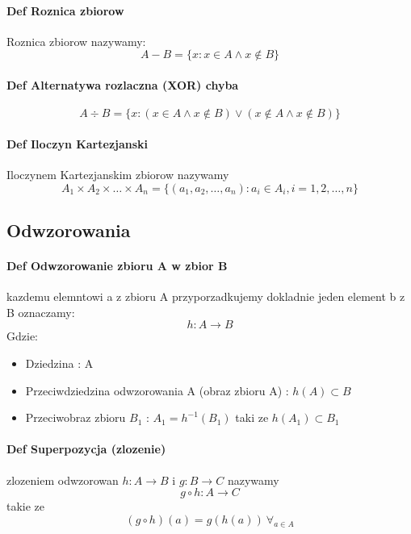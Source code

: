 \documentclass[a4paper]{article}
\begin{document}
    \paragraph{Def Roznica zbiorow}
    Roznica zbiorow nazywamy:
    \begin{equation}
        A - B  = \{x:x \in A \wedge x \notin B\}
    \end{equation}
    \paragraph{Def Alternatywa rozlaczna (XOR) chyba}
    \begin{equation}
        A \div B = \{ x : (x \in A \wedge x \notin B ) \vee (x \notin A \wedge x \notin B) \}
    \end{equation}
    \paragraph{Def Iloczyn Kartezjanski}
    Iloczynem Kartezjanskim zbiorow nazywamy
    \begin{equation}
        A_1 \times A_2 \times \ldots \times A_n = \{ (a_1,a_2, \ldots ,a_n ) : a_i \in A_i, i = 1,2,\ldots,n \}
    \end{equation}
\subsection{Odwzorowania}
\paragraph{Def Odwzorowanie zbioru A w zbior B}
kazdemu elemntowi a z zbioru A przyporzadkujemy dokladnie jeden element b z B oznaczamy:
\begin{equation}
h : A \rightarrow B
\end{equation}
Gdzie:
\begin{itemize}
    \item Dziedzina : A
    \item Przeciwdziedzina odwzorowania A (obraz zbioru A) : $ h(A) \subset B $
    \item Przeciwobraz zbioru $ B_1 $ : $ A_1 = h^{-1}(B_1) $ taki ze $ h(A_1) \subset B_1 $
\end{itemize}
\paragraph{Def Superpozycja (zlozenie)}
zlozeniem odwzorowan $ h : A \rightarrow B $ i $ g : B \rightarrow C $ nazywamy
\begin{equation}
    g \circ h : A \rightarrow C
\end{equation}
 takie ze
\begin{equation}
    (g \circ h)(a) = g(h(a)) \ \forall_{a \in A}
\end{equation}
\end{document}
